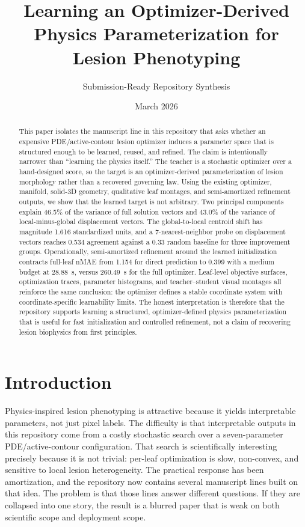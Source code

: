 \documentclass[11pt,a4paper]{article}
\title{Learning an Optimizer-Derived Physics Parameterization for Lesion Phenotyping}
\author{Submission-Ready Repository Synthesis}
\date{March 2026}
\newcommand{\nmae}{nMAE}
\begin{document}
\maketitle

\begin{abstract}
This paper isolates the manuscript line in this repository that asks whether an expensive PDE/active-contour lesion optimizer induces a parameter space that is structured enough to be learned, reused, and refined.
The claim is intentionally narrower than ``learning the physics itself.''
The teacher is a stochastic optimizer over a hand-designed score, so the target is an optimizer-derived parameterization of lesion morphology rather than a recovered governing law.
Using the existing optimizer, manifold, solid-3D geometry, qualitative leaf montages, and semi-amortized refinement outputs, we show that the learned target is not arbitrary.
Two principal components explain 46.5\% of the variance of full solution vectors and 43.0\% of the variance of local-minus-global displacement vectors.
The global-to-local centroid shift has magnitude 1.616 standardized units, and a 7-nearest-neighbor probe on displacement vectors reaches 0.534 agreement against a 0.33 random baseline for three improvement groups.
Operationally, semi-amortized refinement around the learned initialization contracts full-leaf \nmae{} from 1.154 for direct prediction to 0.399 with a medium budget at 28.88~s, versus 260.49~s for the full optimizer.
Leaf-level objective surfaces, optimization traces, parameter histograms, and teacher--student visual montages all reinforce the same conclusion: the optimizer defines a stable coordinate system with coordinate-specific learnability limits.
The honest interpretation is therefore that the repository supports learning a structured, optimizer-defined physics parameterization that is useful for fast initialization and controlled refinement, not a claim of recovering lesion biophysics from first principles.
\end{abstract}

\section{Introduction}
Physics-inspired lesion phenotyping is attractive because it yields interpretable parameters, not just pixel labels.
The difficulty is that interpretable outputs in this repository come from a costly stochastic search over a seven-parameter PDE/active-contour configuration.
That search is scientifically interesting precisely because it is not trivial: per-leaf optimization is slow, non-convex, and sensitive to local lesion heterogeneity.
The practical response has been amortization, and the repository now contains several manuscript lines built on that idea.
The problem is that those lines answer different questions.
If they are collapsed into one story, the result is a blurred paper that is weak on both scientific scope and deployment scope.
\end{document}
